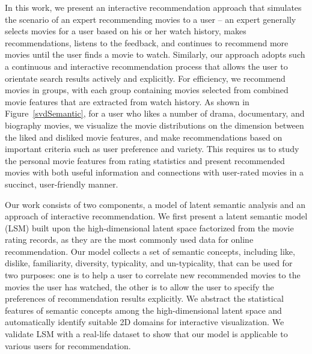 \documentclass{vgtc}                          %
\begin{document}

In this work, we present an interactive recommendation approach that simulates the scenario of an expert recommending movies to a user -- an expert generally selects movies for a user based on his or her watch history, makes recommendations, listens to the feedback, and continues to recommend more movies until the user finds a movie to watch.
Similarly, our approach adopts such a continuous and interactive recommendation process that allows the user to orientate search results actively and explicitly.
For efficiency, we recommend movies in groups, with each group 
containing movies selected from combined movie features that are extracted from watch history.
As shown in Figure~\ref{svdSemantic}, for a user who likes a number of drama, documentary, and biography movies, we visualize the movie distributions on the dimension between the liked and disliked movie features, and make recommendations based on important criteria such as user preference and variety.
This requires us to study the personal movie features from rating statistics and present recommended movies with both useful information and connections with user-rated movies in a succinct, user-friendly manner.

Our work consists of two components, a model of latent semantic analysis and an approach of interactive recommendation.
We first present a latent semantic model (LSM) built upon the high-dimensional latent space factorized from the movie rating records, as they are the most commonly used data for online recommendation.
Our model collects a set of semantic concepts, including like, dislike, familiarity, diversity, typicality, and un-typicality, that can be used for two purposes:
one is to help a user to correlate new recommended movies to the movies the user has watched, the other is to allow the user to specify the preferences of recommendation results explicitly.
We abstract the statistical features of semantic concepts among the high-dimensional latent space and automatically identify suitable 2D domains for interactive visualization.
We validate LSM with a real-life dataset to show that our model is applicable to various users for recommendation.
\end{document}
